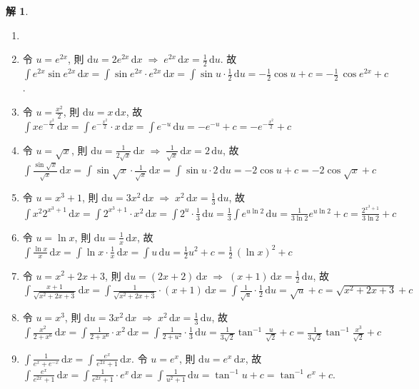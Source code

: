 \documentclass[12pt]{extarticle}
\newcommand{\ds}{\displaystyle}
\newcommand{\ie}{\;\Longrightarrow\;}
\theoremstyle{definition}
\newtheorem*{sol}{解}
\begin{document}
\begin{sol}
  \begin{enumerate}\setlength{\itemsep}{0pt}
    \item[]
    \item 令 $u = e^{2x}$, 則 $\ds\text{d}u = 2e^{2x}\,\text{d}x\ie e^{2x}\,\text{d}x = \frac{1}{2}\,\text{d}u$. 故 $\ds\int e^{2x}\sin{e^{2x}}\,\text{d}x = \int\!\sin{e^{2x}}\cdot e^{2x}\,\text{d}x = \int\!\sin u\cdot\frac{1}{2}\,\text{d}u = -\frac{1}{2}\cos u + c = -\frac{1}{2}\,\cos{e^{2x}} + c$. 
    \item 令 $\ds u = \frac{x^2}{2}$, 則 $\ds\text{d}u = x\,\text{d}x$, 故 $\ds\int x e^{-\frac{x^2}{2}}\,\text{d}x = \int e^{-\frac{x^2}{2}}\cdot x\,\text{d}x = \int e^{-u}\,\text{d}u = -e^{-u} + c = -e^{-\frac{x^2}{2}} + c$
    \item 令 $\ds u = \sqrt{x}$, 則 $\ds\text{d}u = \frac{1}{2\sqrt{x}}\,\text{d}x\ie \frac{1}{\sqrt{x}}\,\text{d}x = 2\,\text{d}u$, 故 $\ds\int\!\frac{\sin{\sqrt{x}}}{\sqrt{x}}\,\text{d}x = \int\!\sin{\sqrt{x}}\cdot\frac{1}{\sqrt{x}}\,\text{d}x = \int\!\sin u\cdot 2\,\text{d}u = -2\cos u + c = -2\cos{\sqrt{x}} + c$
    \item 令 $\ds u = x^3 + 1$, 則 $\ds\text{d} u = 3 x^2\,\text{d}x\ie x^2\,\text{d}x = \frac{1}{3}\,\text{d}u$, 故 $\ds\int x^2 2^{x^3 + 1}\,\text{d}x = \int 2^{x^3 + 1}\cdot x^2\,\text{d}x = \int 2^u\cdot\frac{1}{3}\,\text{d}u = \frac{1}{3}\int e^{u\ln 2}\,\text{d}u = \frac{1}{3\ln 2}e^{u\ln 2} + c = \frac{2^{x^3 + 1}}{3\ln 2} + c$
    \item 令 $\ds u = \ln x$, 則 $\ds\text{d} u = \frac{1}{x}\,\text{d}x$, 故 $\ds\int\!\frac{\ln x}{x}\,\text{d}x = \int\!\ln x\cdot\frac{1}{x}\,\text{d}x = \int u\,\text{d}u = \frac{1}{2} u^2 + c = \frac{1}{2}\,(\ln x)^2 + c$
    \item 令 $\ds u = x^2 + 2x + 3$, 則 $\ds\text{d} u = (2 x + 2)\,\text{d}x\ie (x + 1)\,\text{d}x = \frac{1}{2}\,\text{d}u$, 故 $\ds\int\!\frac{x + 1}{\sqrt{x^2 + 2x + 3}}\,\text{d}x = \int\!\frac{1}{\sqrt{x^2 + 2x + 3}}\cdot(x + 1)\,\text{d}x = \int\!\frac{1}{\sqrt{u}}\cdot\frac{1}{2}\,\text{d}u = \sqrt{u} + c = \sqrt{x^2 + 2x + 3} + c$
    \item 令 $\ds u = x^3$, 則 $\ds\text{d} u = 3x^2\,\text{d}x\ie x^2\,\text{d}x = \frac{1}{3}\,\text{d}u$, 故 $\ds\int\!\frac{x^2}{2 + x^6}\,\text{d}x = \int\!\frac{1}{2 + x^6}\cdot x^2\,\text{d}x = \int\!\frac{1}{2 + u^2}\cdot\frac{1}{3}\,\text{d}u = \frac{1}{3\sqrt{2}}\tan^{-1}\frac{u}{\sqrt{2}} + c = \frac{1}{3\sqrt{2}}\tan^{-1}{\frac{x^3}{\sqrt{2}}} + c$
    \item $\ds\int\!\frac{1}{e^x + e^{-x}}\,\text{d}x = \int\!\frac{e^x}{e^{2x} + 1}\,\text{d}x$. 令 $\ds u = e^x$, 則 $\ds\text{d}u = e^x\,\text{d}x$, 故 $\ds\int\!\frac{e^x}{e^{2x} + 1}\,\text{d}x = \int\!\frac{1}{e^{2x} + 1}\cdot e^x\,\text{d}x = \int\!\frac{1}{u^2 + 1}\,\text{d}u = \tan^{-1}u + c = \tan^{-1}{e^{x}} + c$. 

\end{enumerate}
\end{sol}
\end{document}
